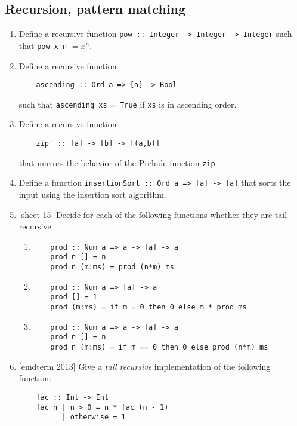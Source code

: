 \documentclass{article}
\begin{document}
\subsection{Recursion, pattern matching}
\begin{enumerate}
\item Define a recursive function \verb|pow :: Integer -> Integer -> Integer| such that \verb|pow x n| $= x^n$.

\item Define a recursive function
\begin{verbatim}
    ascending :: Ord a => [a] -> Bool
\end{verbatim}
such that \verb|ascending xs = True| if \verb|xs| is in ascending order.

\item Define a recursive function
\begin{verbatim}
    zip' :: [a] -> [b] -> [(a,b)]
\end{verbatim}
that mirrors the behavior of the Prelude function \verb|zip|.

\item Define a function \verb|insertionSort :: Ord a => [a] -> [a]| that sorts the input using the insertion sort algorithm.

\item {[sheet 15]} Decide for each of the following functions whether they are tail recursive:
\begin{enumerate}
\item \begin{verbatim}
    prod :: Num a => a -> [a] -> a
    prod n [] = n
    prod n (m:ms) = prod (n*m) ms
\end{verbatim}
\item \begin{verbatim}
    prod :: Num a => [a] -> a
    prod [] = 1
    prod (m:ms) = if m = 0 then 0 else m * prod ms
\end{verbatim}
\item \begin{verbatim}
    prod :: Num a => a -> [a] -> a
    prod n [] = n
    prod n (m:ms) = if m == 0 then 0 else prod (n*m) ms
\end{verbatim}
\end{enumerate}

\item {[emdterm 2013]} Give a \textit{tail recursive} implementation of the following function:
\begin{verbatim}
    fac :: Int -> Int
    fac n | n > 0 = n * fac (n - 1)
          | otherwise = 1
\end{verbatim}


\end{enumerate}
\end{document}
